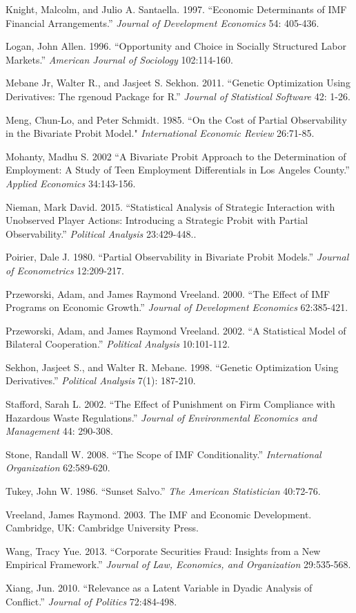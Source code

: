 \documentclass[10pt]{article}
\begin{document}
\begin{hangparas}{.25in}{1}
Knight, Malcolm, and Julio A. Santaella. 1997. ``Economic Determinants of IMF Financial Arrangements.'' \textit{Journal of Development Economics} 54: 405-436.

Logan, John Allen. 1996. ``Opportunity and Choice in Socially Structured Labor Markets.'' \textit{American Journal of Sociology} 102:114-160.

Mebane Jr, Walter R., and Jasjeet S. Sekhon. 2011. ``Genetic Optimization Using Derivatives: The rgenoud Package for R.'' \textit{Journal of Statistical Software} 42: 1-26.

Meng, Chun-Lo, and Peter Schmidt. 1985. ``On the Cost of Partial Observability in the Bivariate Probit Model." \textit{International Economic Review} 26:71-85.

Mohanty, Madhu S. 2002 ``A Bivariate Probit Approach to the Determination of Employment: A Study of Teen Employment Differentials in Los Angeles County.'' \textit{Applied Economics} 34:143-156.

Nieman, Mark David. 2015. ``Statistical Analysis of Strategic Interaction with Unobserved Player Actions: Introducing a Strategic Probit with Partial Observability.'' \textit{Political Analysis} 23:429-448..

Poirier, Dale J. 1980. ``Partial Observability in Bivariate Probit Models.'' \textit{Journal of Econometrics} 12:209-217.

Przeworski, Adam, and James Raymond Vreeland. 2000. ``The Effect of IMF Programs on Economic Growth.'' \textit{Journal of Development Economics} 62:385-421.

Przeworski, Adam, and James Raymond Vreeland. 2002. ``A Statistical Model of Bilateral Cooperation.'' \textit{Political Analysis} 10:101-112.

Sekhon, Jasjeet S., and Walter R. Mebane. 1998. ``Genetic Optimization Using Derivatives.'' \textit{Political Analysis} 7(1): 187-210.

Stafford, Sarah L. 2002. ``The Effect of Punishment on Firm Compliance with Hazardous Waste Regulations.'' \textit{Journal of Environmental Economics and Management} 44: 290-308.

Stone, Randall W. 2008. ``The Scope of IMF Conditionality.'' \textit{International Organization} 62:589-620.

Tukey, John W. 1986. ``Sunset Salvo.'' \textit{The American Statistician} 40:72-76.

Vreeland, James Raymond. 2003. The IMF and Economic Development. Cambridge, UK: Cambridge University Press.

Wang, Tracy Yue. 2013. ``Corporate Securities Fraud: Insights from a New Empirical Framework.'' \textit{Journal of Law, Economics, and Organization} 29:535-568.

Xiang, Jun. 2010. ``Relevance as a Latent Variable in Dyadic Analysis of Conflict.'' \textit{Journal of Politics} 72:484-498.
\end{hangparas}
\end{document}
